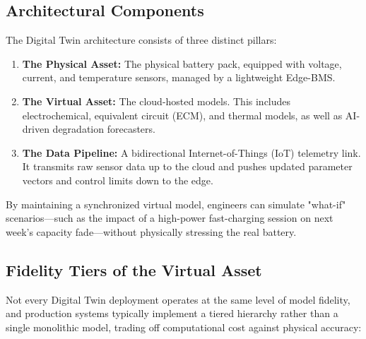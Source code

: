 \subsection{Architectural Components}
\label{subsec:15_architectural_components}

The Digital Twin architecture consists of three distinct pillars:
\begin{enumerate}
    \item \textbf{The Physical Asset:} The physical battery pack, equipped with voltage, current, and temperature sensors, managed by a lightweight Edge-BMS.
    \item \textbf{The Virtual Asset:} The cloud-hosted models. This includes electrochemical, equivalent circuit (ECM), and thermal models, as well as AI-driven degradation forecasters.
    \item \textbf{The Data Pipeline:} A bidirectional Internet-of-Things (IoT) telemetry link. It transmits raw sensor data up to the cloud and pushes updated parameter vectors and control limits down to the edge.
\end{enumerate}

By maintaining a synchronized virtual model, engineers can simulate "what-if" scenarios—such as the impact of a high-power fast-charging session on next week's capacity fade—without physically stressing the real battery.

\subsection{Fidelity Tiers of the Virtual Asset}
\label{subsec:15_fidelity_tiers}

Not every Digital Twin deployment operates at the same level of model fidelity, and production systems typically implement a tiered hierarchy rather than a single monolithic model, trading off computational cost against physical accuracy:

